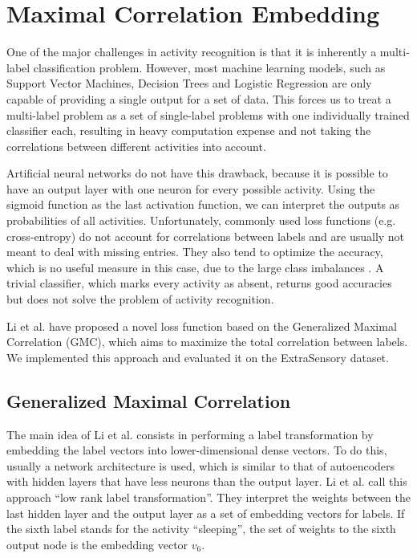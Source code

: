 \section{Maximal Correlation Embedding}

One of the major challenges in activity recognition is that it is inherently a multi-label classification problem. However, most machine learning models, such as Support Vector Machines, Decision Trees and Logistic Regression are only capable of providing a single output for a set of data. This forces us to treat a multi-label problem as a set of single-label problems with one individually trained classifier each, resulting in heavy computation expense and not taking the correlations between different activities into account.

Artificial neural networks do not have this drawback, because it is possible to have an output layer with one neuron for every possible activity. Using the sigmoid function as the last activation function, we can interpret the outputs as probabilities of all activities. Unfortunately, commonly used loss functions (e.g. cross-entropy) do not account for correlations between labels and are usually not meant to deal with missing entries. They also tend to optimize the accuracy, which is no useful measure in this case, due to the large class imbalances \cite{Vaizman17}. A trivial classifier, which marks every activity as absent, returns good accuracies but does not solve the problem of activity recognition.

Li et al. \cite{Li19} have proposed a novel loss function based on the Generalized Maximal Correlation (GMC), which aims to maximize the total correlation between labels. We implemented this approach and evaluated it on the ExtraSensory dataset.

\subsection{Generalized Maximal Correlation}

The main idea of Li et al. \cite{li2019} consists in performing a label transformation by embedding the label vectors into lower-dimensional dense vectors. To do this, usually a network architecture is used, which is similar to that of autoencoders with hidden layers that have less neurons than the output layer. Li et al. call this approach \enquote{low rank label transformation}. They interpret the weights between the last hidden layer and the output layer as a set of embedding vectors for labels. If the sixth label stands for the activity \enquote{sleeping}, the set of weights to the sixth output node is the embedding vector $v_6$.

